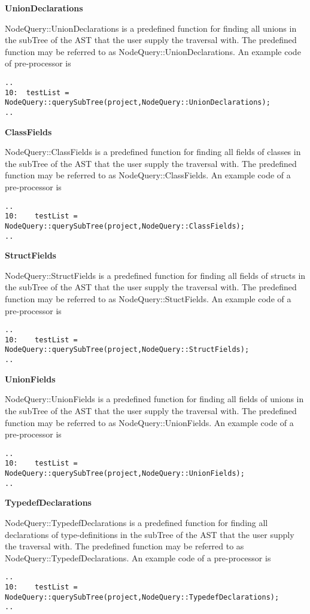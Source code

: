 {\textbf{UnionDeclarations}


NodeQuery::UnionDeclarations is a predefined function for finding all
unions in the subTree of the AST that the user supply the
traversal with. The predefined function may be referred to as
NodeQuery::UnionDeclarations. An example code of pre-processor is
\begin{verbatim}
..
10:  testList = NodeQuery::querySubTree(project,NodeQuery::UnionDeclarations);
..
\end{verbatim}

\textbf{ClassFields}

NodeQuery::ClassFields is a predefined function for finding all fields
of classes in the subTree of the AST that the user supply the
traversal with. The predefined function may be referred to as
NodeQuery::ClassFields. An example code of a pre-processor is
\begin{verbatim}
..
10:    testList = NodeQuery::querySubTree(project,NodeQuery::ClassFields);
..
\end{verbatim}


\textbf{StructFields}

NodeQuery::StructFields is a predefined function for finding all fields
of structs in the subTree of the AST that the user supply the
traversal with. The predefined function may be referred to as
NodeQuery::StuctFields. An example code of a pre-processor is
\begin{verbatim}
..	
10:    testList = NodeQuery::querySubTree(project,NodeQuery::StructFields);
..
\end{verbatim}



\textbf{UnionFields}

NodeQuery::UnionFields is a predefined function for finding all fields
of unions in the subTree of the AST that the user supply the
traversal with. The predefined function may be referred to as
NodeQuery::UnionFields. An example code of a pre-processor is
\begin{verbatim}
..
10:    testList = NodeQuery::querySubTree(project,NodeQuery::UnionFields);
..
\end{verbatim}

\textbf{TypedefDeclarations}

NodeQuery::TypedefDeclarations is a predefined function for finding
all declarations of type-definitions in the subTree of the AST that
the user supply the traversal with. The predefined function may be 
referred to as NodeQuery::TypedefDeclarations. An example code of a 
pre-processor is 
\begin{verbatim}
..
10:    testList = NodeQuery::querySubTree(project,NodeQuery::TypedefDeclarations);
..
\end{verbatim}

}
